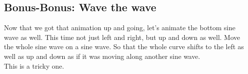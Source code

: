 \subsection{Bonus-Bonus: Wave the wave}
Now that we got that animation up and going, let's animate the bottom sine
wave as well. This time not just left and right, but up and down as well.
Move the whole sine wave on a sine wave. So that the whole curve shifts to
the left as well as up and down as if it was moving along another sine wave.\\
This is a tricky one.


